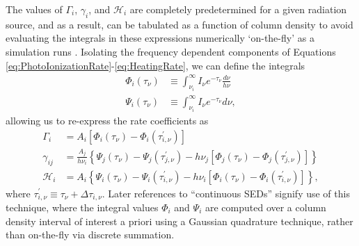 \documentclass[letterpaper,titlepage,12pt]{article}
\numberwithin{equation}{section}
\newcommand{\Heat}{\mathcal{H}}
\begin{document}
The values of $\Gamma_i$, $\gamma_i$, and $\Heat_i$ are completely
predetermined for a given radiation source, and as a result, can be tabulated
as a function of column density to avoid evaluating the
integrals in these expressions numerically `on-the-fly' as a simulation runs
\citep[e.g.][]{Mellema2006,Thomas2008}. Isolating the frequency dependent
components of Equations \ref{eq:PhotoIonizationRate}-\ref{eq:HeatingRate}, we
can define the integrals
\begin{align}
    \Phi_i (\tau_{\nu}) & \equiv \int_{\nu_i}^{\infty} I_{\nu} e^{-\tau_{\nu}} \frac{d\nu}{h\nu} \label{eq:PHI} \\
    \Psi_i (\tau_{\nu}) & \equiv \int_{\nu_i}^{\infty} I_{\nu} e^{-\tau_{\nu}} d\nu \label{eq:PSI},
\end{align}
allowing us to re-express the rate coefficients as
\begin{align}
    \Gamma_i & = A_i \left[\Phi_i(\tau_{\nu}) - \Phi_i(\tau_{i,\nu}^{\prime}) \right] \label{eq:Gamma_PhiPsi} \\
    \gamma_{ij} & = \frac{A_j}{h\nu_i} \left\{\Psi_j(\tau_{\nu}) - \Psi_j(\tau_{j,\nu}^{\prime}) - h \nu_j \left[\Phi_j(\tau_{\nu}) - \Phi_j(\tau_{j,\nu}^{\prime}) \right] \right\}  \label{eq:gamma_PhiPsi} \\
    \Heat_i & = A_i \left\{\Psi_i(\tau_{\nu}) - \Psi_i(\tau_{i,\nu}^{\prime}) - h\nu_i \left[\Phi_i(\tau_{\nu}) - \Phi_i(\tau_{i,\nu}^{\prime}) \right] \right\} \label{eq:Heat_PhiPsi},  
\end{align}
where $\tau_{i,\nu}^{\prime} \equiv \tau_{\nu} + \Delta \tau_{i, \nu}$. Later
references to ``continuous SEDs'' signify use of this technique, where the
integral values $\Phi_i$ and $\Psi_i$ are computed over a column density
interval of interest a priori using a Gaussian quadrature technique, rather
than on-the-fly via discrete summation.
\end{document}
